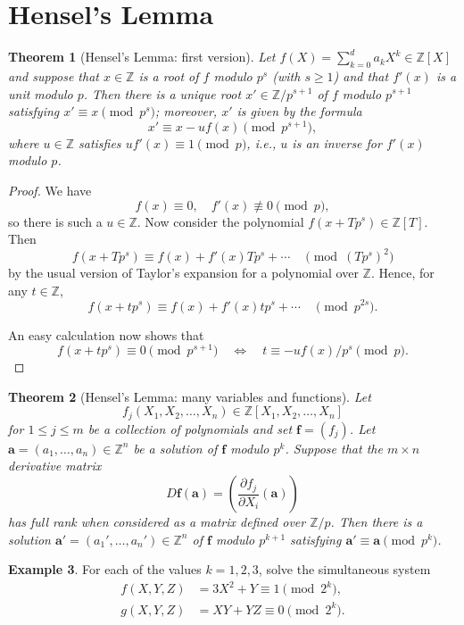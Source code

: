 \documentclass[11pt]{book}
\theoremstyle{plain}
\newtheorem{theorem}{Theorem}[chapter]
\theoremstyle{definition}
\newtheorem{example}[theorem]{Example}
\begin{document}
\section{Hensel's Lemma}

\begin{theorem}[Hensel's Lemma: first version]
Let $f(X) = \sum_{k=0}^d a_k X^k \in \mathbb{Z}[X]$ and suppose that $x \in \mathbb{Z}$ is a root of $f$ modulo $p^s$ (with $s \geq 1$) and that $f'(x)$ is a unit modulo $p$. Then there is a unique root $x' \in \mathbb{Z}/p^{s+1}$ of $f$ modulo $p^{s+1}$ satisfying $x' \equiv x \pmod{p^s}$; moreover, $x'$ is given by the formula
\[
x' \equiv x - uf(x) \pmod{p^{s+1}},
\]
where $u \in \mathbb{Z}$ satisfies $uf'(x) \equiv 1 \pmod{p}$, i.e., $u$ is an inverse for $f'(x)$ modulo $p$.
\end{theorem}

\begin{proof}
We have
\[
f(x) \equiv 0, \quad f'(x) \not\equiv 0 \pmod{p},
\]
so there is such a $u \in \mathbb{Z}$. Now consider the polynomial $f(x + Tp^s) \in \mathbb{Z}[T]$. Then
\[
f(x + Tp^s) \equiv f(x) + f'(x)Tp^s + \cdots \quad \pmod{(Tp^s)^2}
\]
by the usual version of Taylor's expansion for a polynomial over $\mathbb{Z}$. Hence, for any $t \in \mathbb{Z}$,
\[
f(x + tp^s) \equiv f(x) + f'(x)tp^s + \cdots \quad \pmod{p^{2s}}.
\]

An easy calculation now shows that
\[
f(x + tp^s) \equiv 0 \pmod{p^{s+1}} \quad \Longleftrightarrow \quad t \equiv -uf(x)/p^s \pmod{p}.
\]
\end{proof}

\begin{theorem}[Hensel's Lemma: many variables and functions]
Let
\[
f_j(X_1, X_2, \ldots, X_n) \in \mathbb{Z}[X_1, X_2, \ldots, X_n]
\]
for $1 \leq j \leq m$ be a collection of polynomials and set $\mathbf{f} = (f_j)$. Let $\mathbf{a} = (a_1, \ldots, a_n) \in \mathbb{Z}^n$ be a solution of $\mathbf{f}$ modulo $p^k$. Suppose that the $m \times n$ derivative matrix
\[
D\mathbf{f}(\mathbf{a}) = \left(\frac{\partial f_j}{\partial X_i}(\mathbf{a})\right)
\]
has full rank when considered as a matrix defined over $\mathbb{Z}/p$. Then there is a solution $\mathbf{a}' = (a_1', \ldots, a_n') \in \mathbb{Z}^n$ of $\mathbf{f}$ modulo $p^{k+1}$ satisfying $\mathbf{a}' \equiv \mathbf{a} \pmod{p^k}$.
\end{theorem}

\begin{example}
For each of the values $k = 1, 2, 3$, solve the simultaneous system
\begin{align*}
f(X, Y, Z) &= 3X^2 + Y \equiv 1 \pmod{2^k}, \\
g(X, Y, Z) &= XY + YZ \equiv 0 \pmod{2^k}.
\end{align*}
\end{example}
\end{document}
